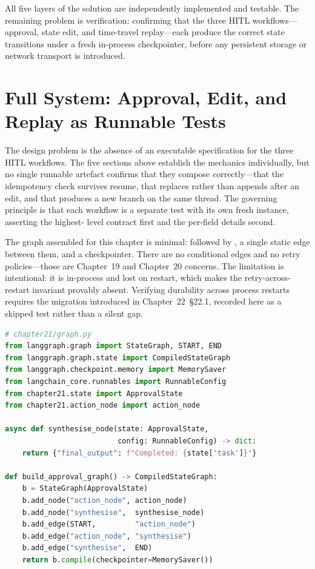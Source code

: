 All five layers of the solution are independently implemented and testable.
The remaining problem is verification: confirming that the three HITL
workflows---approval, state edit, and time-travel replay---each produce the
correct state transitions under a fresh in-process checkpointer, before
any persistent storage or network transport is introduced.


\section{Full System: Approval, Edit, and Replay as Runnable Tests}
\label{sec:hitl-full}

The design problem is the absence of an executable specification for the
three HITL workflows. The five sections above establish the mechanics
individually, but no single runnable artefact confirms that they compose
correctly---that the idempotency check survives resume, that
 replaces rather than appends after an edit, and that
 produces a new branch on the same thread. The
governing principle is that each workflow is a separate 
test with its own fresh  instance, asserting the highest-
level contract first and the per-field details second.

The graph assembled for this chapter is minimal:  followed
by , a single static edge between them, and a
 checkpointer. There are no conditional edges and no retry
policies---those are Chapter~19 and Chapter~20 concerns. The 
limitation is intentional: it is in-process and lost on restart, which makes
the retry-across-restart invariant provably absent. Verifying durability
across process restarts requires the  migration
introduced in Chapter~22~\S22.1, recorded here as a skipped test rather than
a silent gap.

\begin{lstlisting}[language=Python,
  caption={Graph assembly: MemorySaver checkpointer, two nodes, no
           conditional edges},
  label={lst:hitl-graph}]
# chapter21/graph.py
from langgraph.graph import StateGraph, START, END
from langgraph.graph.state import CompiledStateGraph
from langgraph.checkpoint.memory import MemorySaver
from langchain_core.runnables import RunnableConfig
from chapter21.state import ApprovalState
from chapter21.action_node import action_node

async def synthesise_node(state: ApprovalState,
                          config: RunnableConfig) -> dict:
    return {"final_output": f"Completed: {state['task']}"}

def build_approval_graph() -> CompiledStateGraph:
    b = StateGraph(ApprovalState)
    b.add_node("action_node", action_node)
    b.add_node("synthesise",  synthesise_node)
    b.add_edge(START,         "action_node")
    b.add_edge("action_node", "synthesise")
    b.add_edge("synthesise",  END)
    return b.compile(checkpointer=MemorySaver())
\end{lstlisting}


